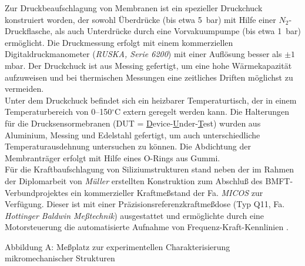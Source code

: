 Zur Druckbeaufschlagung von Membranen ist ein spezieller Druckchuck
konstruiert worden, der sowohl Überdrücke (bis etwa 5~bar) mit Hilfe einer
$N_{2}$-Druckflasche, als auch Unterdrücke durch eine Vorvakuumpumpe
(bis etwa 1~bar) ermöglicht. Die Druckmessung erfolgt mit einem
kommerziellen Digitaldruckmanometer ({\em RUSKA, Serie 6200}) mit einer
Auflösung besser als $\pm1$ mbar. Der Druckchuck ist aus Messing gefertigt,
um eine hohe Wärmekapazität aufzuweisen und bei thermischen Messungen
eine zeitliches Driften möglichst zu vermeiden. \\

Unter dem Druckchuck befindet sich ein heizbarer Temperaturtisch, der in
einem Temperaturbereich von 0--150$^\circ$C extern geregelt werden kann.
Die Halterungen für die Drucksensormebranen
(DUT = \underline{D}evice-\underline{U}nder-\underline{T}est)
wurden aus Aluminium, Messing und Edelstahl gefertigt, um auch
unterschiedliche Temperaturausdehnung untersuchen zu können. Die
Abdichtung der Membranträger erfolgt mit Hilfe eines O-Rings aus Gummi.\\
%
Für die Kraftbaufschlagung von Siliziumstrukturen stand neben der
im Rahmen der Diplomarbeit von {\sl Müller} erstellten Konstruktion
\cite{Mue92} zum Abschluß des BMFT-Verbundprojektes ein kommerzieller
Kraftmeßstand der Fa. {\em MICOS} zur Verfügung. Dieser ist mit einer
Präzisionsreferenzkraftmeßdose (Typ Q11, Fa. {\em Hottinger Baldwin
Meßtechnik}) ausgestattet und ermöglichte durch eine Motorsteuerung die
automatisierte Aufnahme von Frequenz-Kraft-Kennlinien \cite{Wag94}.

\newpage

Abbildung A: Meßplatz zur experimentellen Charakterisierung
mikromechanischer Strukturen\\

